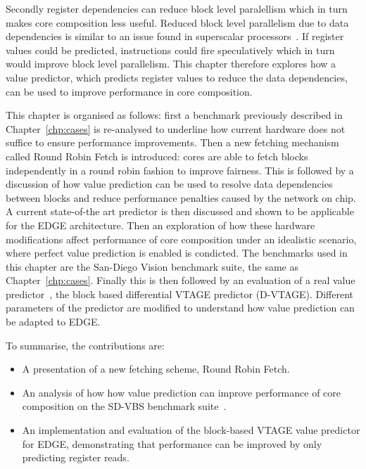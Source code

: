 Secondly register dependencies can reduce block level paralellism which in turn makes core composition less useful.
Reduced block level parallelism due to data dependencies is similar to an issue found in superscalar processors~\cite{peraisBeBop2015}.
If register values could be predicted, instructions could fire speculatively which in turn would improve block level parallelism.
This chapter therefore explores how a value predictor, which predicts register values to reduce the data dependencies, can be used to improve performance in core composition.

This chapter is organised as follows: first a benchmark previously described in Chapter~\ref{chp:cases} is re-analysed to underline how current hardware does not suffice to ensure performance improvements.
Then a new fetching mechanism called Round Robin Fetch is introduced: cores are able to fetch blocks independently in a round robin fashion to improve fairness.
This is followed by a discussion of how value prediction can be used to resolve data dependencies between blocks and reduce performance penalties caused by the network on chip.
A current state-of-the art predictor is then discussed and shown to be applicable for the EDGE architecture.
Then an exploration of how these hardware modifications affect performance of core composition under an idealistic scenario, where perfect value prediction is enabled is condicted.
The benchmarks used in this chapter are the San-Diego Vision benchmark suite, the same as Chapter~\ref{chp:cases}.
Finally this is then followed by an evaluation of a real value predictor~\cite{peraisBeBop2015}, the block based differential VTAGE predictor (D-VTAGE).
Different parameters of the predictor are modified to understand how value prediction can be adapted to EDGE.

To summarise, the contributions are:

\vspace{-1em}
\begin{itemize}
\item A presentation of a new fetching scheme, Round Robin Fetch.
\vspace{-1em}
\item An analysis of how how value prediction can improve performance of core composition on the SD-VBS benchmark suite~\cite{sdvbs}.
\item An implementation and evaluation of the block-based VTAGE value predictor for EDGE, demonstrating that performance can be improved by only predicting register reads.
\end{itemize}